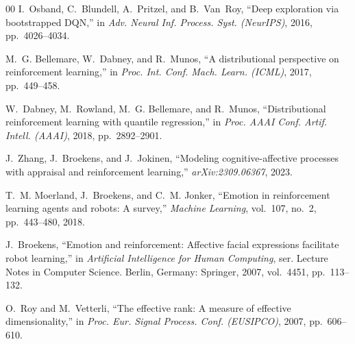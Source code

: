 \documentclass[conference]{IEEEtran}
\begin{document}
\begin{thebibliography}{00}
I.~Osband, C.~Blundell, A.~Pritzel, and B.~Van~Roy, ``Deep exploration via
bootstrapped DQN,'' in \emph{Adv. Neural Inf. Process. Syst. (NeurIPS)},
2016, pp.~4026--4034.

M.~G. Bellemare, W.~Dabney, and R.~Munos, ``A distributional perspective on
reinforcement learning,'' in \emph{Proc. Int. Conf. Mach. Learn. (ICML)},
2017, pp.~449--458.

W.~Dabney, M.~Rowland, M.~G. Bellemare, and R.~Munos, ``Distributional
reinforcement learning with quantile regression,'' in \emph{Proc. AAAI Conf.
Artif. Intell. (AAAI)}, 2018, pp.~2892--2901.

J.~Zhang, J.~Broekens, and J.~Jokinen, ``Modeling cognitive-affective
processes with appraisal and reinforcement learning,''
\emph{arXiv:2309.06367}, 2023.

T.~M. Moerland, J.~Broekens, and C.~M. Jonker, ``Emotion in reinforcement
learning agents and robots: A survey,'' \emph{Machine Learning}, vol.~107,
no.~2, pp.~443--480, 2018.

J.~Broekens, ``Emotion and reinforcement: Affective facial expressions
facilitate robot learning,'' in \emph{Artificial Intelligence for Human
Computing}, ser. Lecture Notes in Computer Science. Berlin, Germany:
Springer, 2007, vol.~4451, pp.~113--132.

O.~Roy and M.~Vetterli, ``The effective rank: A measure of effective
dimensionality,'' in \emph{Proc. Eur. Signal Process. Conf. (EUSIPCO)},
2007, pp.~606--610.

\end{thebibliography}
\end{document}
